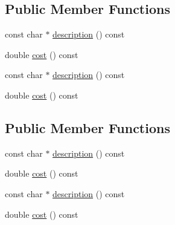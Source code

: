 \subsection*{Public Member Functions}
\begin{DoxyCompactItemize}
\item 
const char $\ast$ \hyperlink{classcoffee_1_1Espresso_a1176df58b3fbeec164c26d11c5b2ab62}{description} () const 
\item 
double \hyperlink{classcoffee_1_1Espresso_ad48532ee375c9c81f6a6042ac90057fc}{cost} () const 
\item 
const char $\ast$ \hyperlink{classcoffee_1_1Espresso_a185fc44710bc9c8e95a027de9e565187}{description} () const 
\item 
double \hyperlink{classcoffee_1_1Espresso_ad48532ee375c9c81f6a6042ac90057fc}{cost} () const 
\end{DoxyCompactItemize}
\subsection*{Public Member Functions}
\begin{DoxyCompactItemize}
\item 
const char $\ast$ \hyperlink{classcoffee_1_1HouseBlend_aa1309b95ad5eefe9c98daef5f1ffb0da}{description} () const 
\item 
double \hyperlink{classcoffee_1_1HouseBlend_a3076f71c59e90441e80cb96754ce81f9}{cost} () const 
\item 
const char $\ast$ \hyperlink{classcoffee_1_1HouseBlend_a43209cc5756571985ae0df4373e5914f}{description} () const 
\item 
double \hyperlink{classcoffee_1_1HouseBlend_a3076f71c59e90441e80cb96754ce81f9}{cost} () const 
\end{DoxyCompactItemize}
